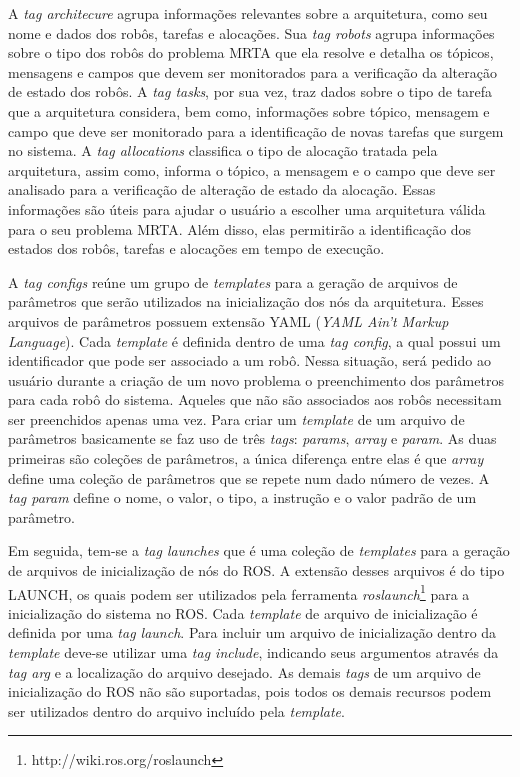             A \textit{tag architecure} agrupa informações relevantes sobre a arquitetura, como seu nome e dados dos robôs, tarefas e alocações. Sua \textit{tag robots} agrupa informações sobre o tipo dos robôs do problema MRTA que ela resolve e detalha os tópicos, mensagens e campos que devem ser monitorados para a verificação da alteração de estado dos robôs. A \textit{tag tasks}, por sua vez, traz dados sobre o tipo de tarefa que a arquitetura considera, bem como, informações sobre tópico, mensagem e campo que deve ser monitorado para a identificação de novas tarefas que surgem no sistema. A \textit{tag allocations} classifica o tipo de alocação tratada pela arquitetura, assim como, informa o tópico, a mensagem e o campo que deve ser analisado para a verificação de alteração de estado da alocação. Essas informações são úteis para ajudar o usuário a escolher uma arquitetura válida para o seu problema MRTA. Além disso, elas permitirão a identificação dos estados dos robôs, tarefas e alocações em tempo de execução.
            
            A \textit{tag configs} reúne um grupo de \textit{templates} para a geração de arquivos de parâmetros que serão utilizados na inicialização dos nós da arquitetura. Esses arquivos de parâmetros possuem extensão YAML (\textit{YAML Ain't Markup Language}). Cada \textit{template} é definida dentro de uma \textit{tag config}, a qual possui um identificador que pode ser associado a um robô. Nessa situação, será pedido ao usuário durante a criação de um novo problema o preenchimento dos parâmetros para cada robô do sistema. Aqueles que não são associados aos robôs necessitam ser preenchidos apenas uma vez. Para criar um \textit{template} de um arquivo de parâmetros basicamente se faz uso de três \textit{tags}: \textit{params}, \textit{array} e \textit{param}. As duas primeiras são coleções de parâmetros, a única diferença entre elas é que \textit{array} define uma coleção de parâmetros que se repete num dado número de vezes. A \textit{tag param} define o nome, o valor, o tipo, a instrução e o valor padrão de um parâmetro.
            
            Em seguida, tem-se a \textit{tag launches} que é uma coleção de \textit{templates} para a geração de arquivos de inicialização de nós do ROS. A extensão desses arquivos é do tipo LAUNCH, os quais podem ser utilizados pela ferramenta \textit{roslaunch}\footnote{http://wiki.ros.org/roslaunch} para a inicialização do sistema no ROS. Cada \textit{template} de arquivo de inicialização é definida por uma \textit{tag launch}. Para incluir um arquivo de inicialização dentro da \textit{template} deve-se utilizar uma \textit{tag include}, indicando seus argumentos através da \textit{tag arg} e a localização do arquivo desejado. As demais \textit{tags} de um arquivo de inicialização do ROS não são suportadas, pois todos os demais recursos podem ser utilizados dentro do arquivo incluído pela \textit{template}.
            
